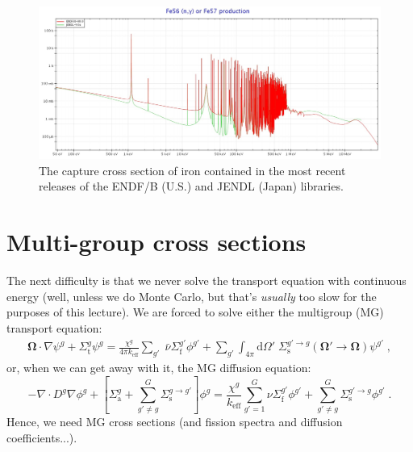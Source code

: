 \documentclass{article}
\begin{document}
\begin{figure}[h!]
	\centering
	\includegraphics[scale=0.3]{./images/iron_XS.jpeg} 
	\caption{The capture cross section of iron contained in the most recent releases of the ENDF/B (U.S.) and JENDL (Japan) libraries.} 
	\label{fig:iron}
\end{figure}

\section{Multi-group cross sections}

The next difficulty is that we never solve the transport equation with continuous energy (well, unless we do Monte Carlo, but that's \textit{usually} too slow for the purposes of this lecture). We are forced to solve either the multigroup (MG) transport equation:
\begin{equation}\label{eq:mg_transport}
    \begin{split}
 \mathbf{\Omega}\cdot\nabla\psi^g + \Sigma^g_\mathrm{t}\psi^g
    =\frac{\chi^g}{4\pi k_\mathrm{eff}}\sum_{g'} \;\bar{\nu}\Sigma^{g'}_\mathrm{f}\phi^{g'} +\sum_{g'}\int_{4\pi}\mathrm{d}{\Omega}' \;\Sigma^{g'\rightarrow g}_\mathrm{s}\left(\mathbf{\Omega}'\rightarrow\mathbf{\Omega}\right)\psi^{g'}\;\mathrm{,}
    \end{split}
\end{equation}
or, when we can get away with it, the MG diffusion equation:
\begin{equation}\label{eq:mg_diffusion}
    -\nabla\cdot D^g\nabla\phi^g + \left[\Sigma^g_\mathrm{a}+\sum^G_{g'\neq g}\Sigma^{g\rightarrow g'}_\mathrm{s}\right]\phi^g = \frac{\chi^g}{k_\mathrm{eff}}\sum^G_{g'=1}\nu\Sigma^{g'}_\mathrm{f}\phi^{g'} + \sum^G_{g'\neq g} \Sigma^{g'\rightarrow g}_\mathrm{s}\phi^{g'}\;\mathrm{.}
\end{equation}
Hence, we need MG cross sections (and fission spectra and diffusion coefficients...).
\end{document}
